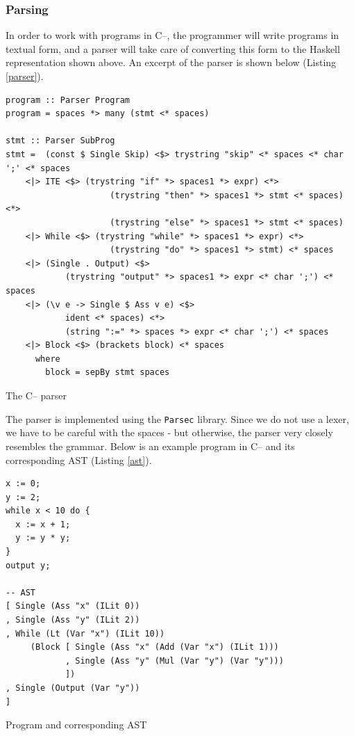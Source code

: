 \documentclass{article}
\begin{document}
\subsubsection{Parsing}\label{parsing}

In order to work with programs in C--, the programmer will write
programs in textual form, and a parser will take care of converting this
form to the Haskell representation shown above. An excerpt of the parser
is shown below (Listing \ref{parser}).

\begin{listing}[H]
\begin{verbatim}
program :: Parser Program
program = spaces *> many (stmt <* spaces)

stmt :: Parser SubProg
stmt =  (const $ Single Skip) <$> trystring "skip" <* spaces <* char ';' <* spaces
    <|> ITE <$> (trystring "if" *> spaces1 *> expr) <*>
                     (trystring "then" *> spaces1 *> stmt <* spaces) <*>
                     (trystring "else" *> spaces1 *> stmt <* spaces)
    <|> While <$> (trystring "while" *> spaces1 *> expr) <*>
                     (trystring "do" *> spaces1 *> stmt) <* spaces
    <|> (Single . Output) <$>
            (trystring "output" *> spaces1 *> expr <* char ';') <* spaces
    <|> (\v e -> Single $ Ass v e) <$>
            ident <* spaces) <*>
            (string ":=" *> spaces *> expr <* char ';') <* spaces
    <|> Block <$> (brackets block) <* spaces
      where
        block = sepBy stmt spaces
\end{verbatim}
\caption{The C-- parser}
\label{parser}
\end{listing}

The parser is implemented using the \texttt{Parsec} library. Since we do
not use a lexer, we have to be careful with the spaces - but otherwise,
the parser very closely resembles the grammar. Below is an example
program in C-- and its corresponding AST (Listing \ref{ast}).

\begin{listing}[H]
\begin{verbatim}
x := 0;
y := 2;
while x < 10 do {
  x := x + 1;
  y := y * y;
}
output y;

-- AST
[ Single (Ass "x" (ILit 0))
, Single (Ass "y" (ILit 2))
, While (Lt (Var "x") (ILit 10))
     (Block [ Single (Ass "x" (Add (Var "x") (ILit 1)))
            , Single (Ass "y" (Mul (Var "y") (Var "y")))
            ])
, Single (Output (Var "y"))
]
\end{verbatim}
\caption{Program and corresponding AST}
\label{ast}
\end{listing}
\end{document}
